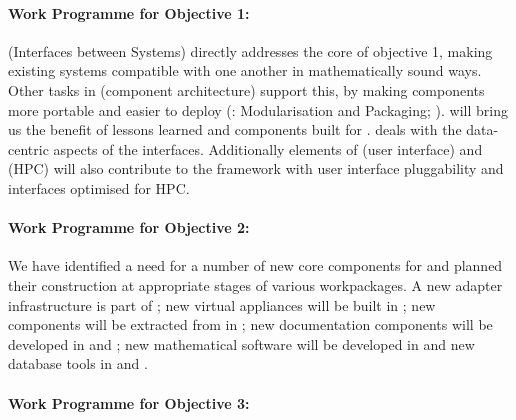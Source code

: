 \documentclass[noworkareas,deliverables,\classoptions]{euproposal}       %
\begin{document}
\begin{proposal}

\paragraph{Work Programme for Objective 1: }

 (Interfaces
between Systems) directly addresses the core of objective 1, making
existing systems compatible with one another in mathematically sound
ways. Other tasks in  (component
architecture) support this, by making components more portable and
easier to deploy (:
Modularisation and Packaging;
). 
will bring us the benefit of lessons learned and components built for
\SMC.  deals with the data-centric
aspects of the interfaces. Additionally elements of  (user interface) and  (HPC)
will also contribute to the framework with user interface pluggability
and interfaces optimised for HPC.

\paragraph{Work Programme for Objective 2: }

We have identified a need for a number of new core components for
\TheProject and planned their construction at appropriate stages of
various workpackages. A new adapter infrastructure is part of
; new virtual
appliances will be built in
; new components will be
extracted from \SMC in  ;
new documentation components will be developed in
 and ; new
mathematical software will be developed in 
and new database tools in  and .


\paragraph{Work Programme for Objective 3: }


\end{proposal}
\end{document}
